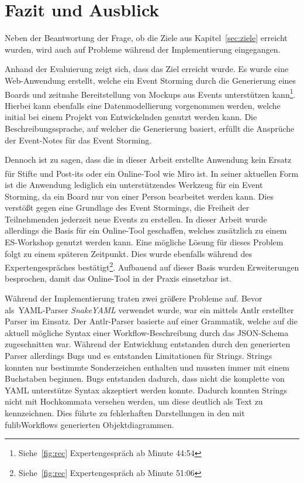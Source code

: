 \chapter{Fazit und Ausblick}\label{ch:fazit}

Neben der Beantwortung der Frage, ob die Ziele aus Kapitel~\ref{sec:ziele} erreicht wurden, wird auch auf Probleme während
der Implementierung eingegangen.

Anhand der Evaluierung zeigt sich, dass das Ziel erreicht wurde.
Es wurde eine Web-Anwendung erstellt, welche ein Event Storming durch die Generierung eines Boards und zeitnahe Bereitstellung von Mockups aus Events unterstützen kann\footnote{Siehe~\ref{fig:rec} Expertengespräch ab Minute  44:54}.
Hierbei kann ebenfalls eine Datenmodellierung vorgenommen werden, welche initial bei einem Projekt von Entwickelnden genutzt werden kann.
Die Beschreibungssprache, auf welcher die Generierung basiert, erfüllt die Ansprüche der Event-Notes für das Event Storming.

Dennoch ist zu sagen, dass die in dieser Arbeit erstellte Anwendung kein Ersatz für Stifte und Post-its\textsuperscript{\textregistered} oder ein Online-Tool wie Miro ist.
In seiner aktuellen Form ist die Anwendung lediglich ein unterstützendes Werkzeug für ein Event Storming, da ein Board nur von einer Person bearbeitet werden kann.
Dies verstößt gegen eine Grundlage des Event Stormings, die Freiheit der Teilnehmenden jederzeit neue Events zu erstellen.
In dieser Arbeit wurde allerdings die Basis für ein Online-Tool geschaffen, welches zusätzlich zu einem \ac{ES}-Workshop genutzt werden kann.
Eine mögliche Lösung für dieses Problem folgt zu einem späteren Zeitpunkt.
Dies wurde ebenfalls während des Expertengespräches bestätigt\footnote{Siehe~\ref{fig:rec} Expertengespräch ab Minute  51:06}.
Aufbauend auf dieser Basis wurden Erweiterungen besprochen, damit das Online-Tool in der Praxis einsetzbar ist.

Während der Implementierung traten zwei größere Probleme auf.
Bevor als~\ac{YAML}-Parser \textit{SnakeYAML} verwendet wurde, war ein mittels \ac{Antlr} erstellter Parser im Einsatz.
Der \ac{Antlr}-Parser basierte auf einer Grammatik, welche auf die aktuell mögliche Syntax einer Workflow-Beschreibung durch das JSON-Schema zugeschnitten war.
Während der Entwicklung entstanden durch den generierten Parser allerdings Bugs und es entstanden Limitationen für Strings.
Strings konnten nur bestimmte Sonderzeichen enthalten und mussten immer mit einem Buchstaben beginnen.
Bugs entstanden dadurch, dass nicht die komplette von YAML unterstütze Syntax akzeptiert werden konnte.
Dadurch konnten Strings nicht mit Hochkommata versehen werden, um diese deutlich als Text zu kennzeichnen.
Dies führte zu fehlerhaften Darstellungen in den mit fulibWorkflows generierten Objektdiagrammen.

